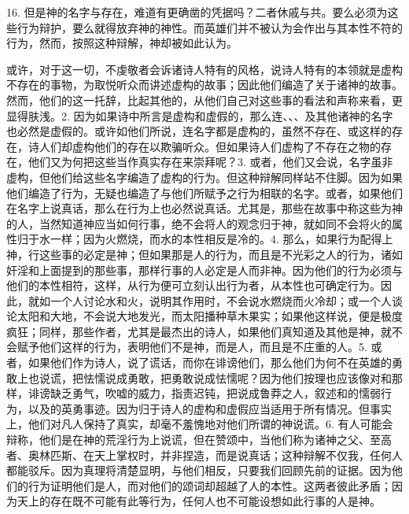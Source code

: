 16.  但是神的名字与存在，难道有更确凿的凭据吗？二者休戚与共。要么必须为这些行为辩护，要么就得放弃神的神性。而英雄们并不被认为会作出与其本性不符的行为，然而，按照这种辩解，神却被如此认为。\par

或许，对于这一切，不虔敬者会诉诸诗人特有的风格，说诗人特有的本领就是虚构不存在的事物，为取悦听众而讲述虚构的故事；因此他们编造了关于诸神的故事。然而，他们的这一托辞，比起其他的，从他们自己对这些事的看法和声称来看，更显得肤浅。2. 因为如果诗中所言是虚构和虚假的，那么连、、、及其他诸神的名字也必然是虚假的。或许如他们所说，连名字都是虚构的，虽然不存在、或这样的存在，诗人们却虚构他们的存在以欺骗听众。但如果诗人们虚构了不存在之物的存在，他们又为何把这些当作真实存在来崇拜呢？3. 或者，他们又会说，名字虽非虚构，但他们给这些名字编造了虚构的行为。但这种辩解同样站不住脚。因为如果他们编造了行为，无疑也编造了与他们所赋予之行为相联的名字。或者，如果他们在名字上说真话，那么在行为上也必然说真话。尤其是，那些在故事中称这些为神的人，当然知道神应当如何行事，绝不会将人的观念归于神，就如同不会将火的属性归于水一样；因为火燃烧，而水的本性相反是冷的。4. 那么，如果行为配得上神，行这些事的必定是神；但如果那是人的行为，而且是不光彩之人的行为，诸如奸淫和上面提到的那些事，那样行事的人必定是人而非神。因为他们的行为必须与他们的本性相符，这样，从行为便可立刻认出行为者，从本性也可确定行为。因此，就如一个人讨论水和火，说明其作用时，不会说水燃烧而火冷却；或一个人谈论太阳和大地，不会说大地发光，而太阳播种草木果实；如果他这样说，便是极度疯狂；同样，那些作者，尤其是最杰出的诗人，如果他们真知道及其他是神，就不会赋予他们这样的行为，表明他们不是神，而是人，而且是不庄重的人。5. 或者，如果他们作为诗人，说了谎话，而你在诽谤他们，那么他们为何不在英雄的勇敢上也说谎，把怯懦说成勇敢，把勇敢说成怯懦呢？因为他们按理也应该像对和那样，诽谤缺乏勇气，吹嘘的威力，指责迟钝，把说成鲁莽之人，叙述和的懦弱行为，以及的英勇事迹。因为归于诗人的虚构和虚假应当适用于所有情况。但事实上，他们对凡人保持了真实，却毫不羞愧地对他们所谓的神说谎。6. 有人可能会辩称，他们是在神的荒淫行为上说谎，但在赞颂中，当他们称为诸神之父、至高者、奥林匹斯、在天上掌权时，并非捏造，而是说真话；这种辩解不仅我，任何人都能驳斥。因为真理将清楚显明，与他们相反，只要我们回顾先前的证据。因为他们的行为证明他们是人，而对他们的颂词却超越了人的本性。这两者彼此矛盾；因为天上的存在既不可能有此等行为，任何人也不可能设想如此行事的人是神。\par

